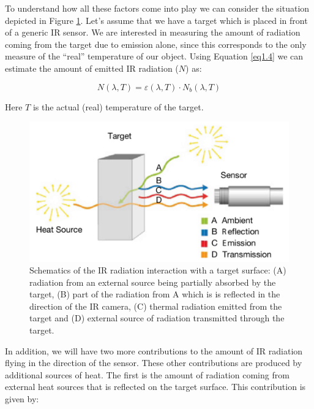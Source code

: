 		To understand how all these factors come into play we can consider the situation depicted in Figure \ref{fig1.6}.  Let's assume that we have a target which is placed in front of a generic IR sensor. We are interested in measuring the amount of radiation coming from the target due to emission alone, since this corresponds to the only measure of the “real” temperature of our object. Using Equation \ref{eq1.4} we can estimate the amount of emitted IR radiation ($N$) as: 
		
		\begin{equation}\label{eq1.8}
			N(\lambda,T)=\varepsilon(\lambda,T) \cdot N_{b}(\lambda, T)
		\end{equation}\bigskip
		
		Here $T$ is the actual (real) temperature of the target.
			
		\begin{figure}[ht!]
			\centering
			\captionsetup{justification=centering,margin=2cm}
			\includegraphics[scale=0.38]{Figures/Chapter01/SchematicsOfIRRadiation.jpg}
			\caption{Schematics of the IR radiation interaction with a target surface: (A) radiation from an external source being partially absorbed by the target, (B) part of the radiation from A which is is reflected in the direction of the IR camera, (C) thermal  radiation emitted from the target and (D) external source of radiation transmitted through the target.}\label{fig1.6}
		\end{figure}
		
		In addition, we will have two more contributions to the amount of IR radiation flying in the direction of the sensor. These other contributions are produced by additional sources of heat. The first is the amount of radiation coming from external heat sources that is reflected on the target surface. This contribution is given by:
		
